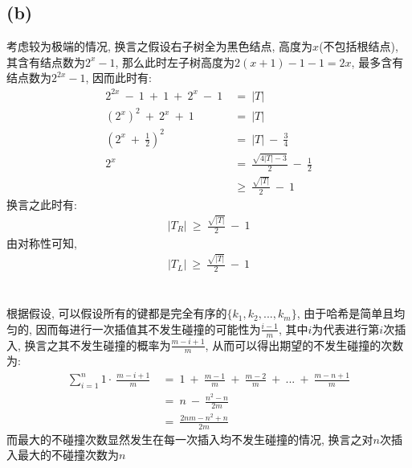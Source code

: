 \documentclass{article}
\begin{document}
\subsection{(b)}
考虑较为极端的情况, 换言之假设右子树全为黑色结点, 高度为$x$(不包括根结点), 其含有结点数为$2^x-1$, 那么此时左子树高度为$2(x+1)-1-1 = 2x$, 最多含有结点数为$2^{2x}-1$, 因而此时有:
\begin{align*}
2^{2x}\ -\ 1\ +\ 1\ +\ 2^x\ -\ 1\ &=\ |T| \\
(2^{x})^2\ +\ 2^x\ +\ 1\ &=\ |T| \\
(2^x\ +\ \frac{1}{2})^2\ &=\ |T|\ -\ \frac{3}{4} \\
2^x\ &=\ \frac{\sqrt{4|T|-3}}{2}\ -\ \frac{1}{2} \\
&\geq \ \frac{\sqrt{|T|}}{2}\ -\ 1
\end{align*}
换言之此时有:
\begin{align*}
|T_R|\ \geq \ \frac{\sqrt{|T|}}{2}\ -\ 1
\end{align*}
由对称性可知, 
\begin{align*}
|T_L|\ \geq \ \frac{\sqrt{|T|}}{2}\ -\ 1
\end{align*}


\section{}
根据假设, 可以假设所有的键都是完全有序的$\{k_1, k_2, ..., k_m\}$, 由于哈希是简单且均匀的, 因而每进行一次插值其不发生碰撞的可能性为$\frac{i-1}{m}$, 其中$i$为代表进行第$i$次插入, 换言之其不发生碰撞的概率为$\frac{m-i+1}{m}$, 从而可以得出期望的不发生碰撞的次数为:
\begin{align*}
\sum_{i=1}^n1 \cdot\ \frac{m-i+1}{m}\ &=\ 1\ +\ \frac{m-1}{m}\ +\ \frac{m-2}{m}\ +\ ...\ +\ \frac{m-n+1}{m} \\
&=\ n\ -\ \frac{n^2-n}{2m} \\
&=\ \frac{2nm-n^2+n}{2m}
\end{align*}
而最大的不碰撞次数显然发生在每一次插入均不发生碰撞的情况, 换言之对$n$次插入最大的不碰撞次数为$n$
\end{document}
